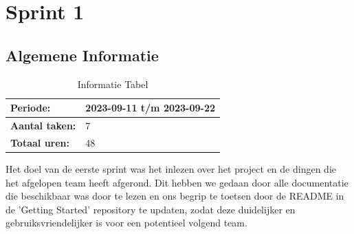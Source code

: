 \documentclass[a4paper]{report}
\begin{document}


\chapter{Sprint 1}
\section{Algemene Informatie}
\begin{table}[H]
\begin{tabularx}{0.6\textwidth}{|X|X|}
  \hline
  \cellcolor[HTML]{99ccff} \textbf{Periode:} & 2023-09-11 t/m 2023-09-22 \\ 
  \hline
  \cellcolor[HTML]{99ccff} \textbf{Aantal taken:} & 7 \\ 
  \hline
  \cellcolor[HTML]{99ccff} \textbf{Totaal uren:} & 48 \\ 
  \hline
\end{tabularx}
\caption{Informatie Tabel}
\label{table:it1:general}
\end{table}

Het doel van de eerste sprint was het inlezen over het project en de dingen die het afgelopen team heeft afgerond.
Dit hebben we gedaan door alle documentatie die beschikbaar was door te lezen en ons begrip te toetsen door de README in de 'Getting Started' repository te updaten, zodat deze duidelijker en gebruiksvriendelijker is voor een potentieel volgend team.
\end{document}
